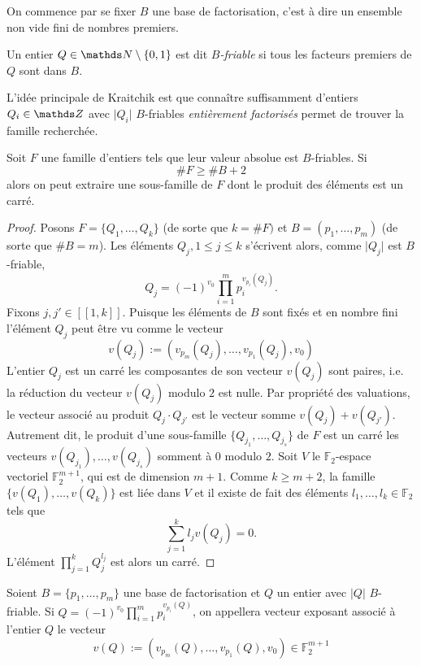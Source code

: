 On commence par se fixer $B$ une base de factorisation, c'est à dire un 
ensemble non vide fini de nombres premiers.

\begin{definition}
	Un entier $Q\in \N\setminus \{0, 1\}$ est dit \emph{$B$-friable} si tous
	les facteurs premiers de $Q$ sont dans $B$.
\end{definition}

L'idée principale de Kraitchik  est que connaître suffisamment
d'entiers $Q_i \in \Z$ avec $ \lvert Q_i \rvert$ $B$-friables 
\emph{entièrement factorisés} permet de trouver la famille recherchée.

\begin{proposition}
	Soit $F$ une famille d'entiers tels que leur valeur absolue est $B$-friables.
    Si \[\# F \geqslant \# B + 2\] alors on peut extraire une sous-famille de
    $F$ dont le produit des éléments est un carré.
\end{proposition}

\begin{proof}
	Posons $F = \{Q_1, \dots, Q_k\}$ (de sorte que $k = \# F)$ et $B = (p_1,
	\dots, p_m)$ (de sorte que $\# B = m$). Les éléments $Q_j, 1\leqslant j
    \leqslant k$ s'écrivent alors, comme $\lvert Q_j \rvert$ est $B$-friable,
    \[Q_j = (-1)^{v_0}\prod_{i=1}^m p_i^{v_{p_i}(Q_j)}.\]
	Fixons $j, j'\in [\![1, k]\!]$. Puisque les éléments de $B$ sont fixés et
	en nombre fini l'élément $Q_j$ peut être vu comme le vecteur
    \[v(Q_j) := (v_{p_m}(Q_j), \dots, v_{p_1}(Q_j), v_0 )\] L'entier $Q_j$ est
    un carré \ssi les composantes de son vecteur $v(Q_j)$ sont paires, i.e. la
	réduction du vecteur $v(Q_j)$ modulo $2$ est nulle. Par propriété des
	valuations, le vecteur associé au produit $Q_j\cdot Q_{j'}$ est le vecteur
	somme $v(Q_j) + v(Q_{j'})$. Autrement dit, le produit d'une sous-famille
	$\{Q_{j_1}, \dots, Q_{j_s}\}$ de $F$ est un carré \ssi les vecteurs
	$v(Q_{j_1}), \dots, v(Q_{j_s})$ somment à $0$ modulo $2$. Soit $V$ le
    $\mathbb{F}_2$-espace vectoriel $\mathbb{F}_2^{m+1}$, qui est de dimension
    $m+1$. Comme $k\geqslant m+2$, la famille $\{v(Q_1), \dots, v(Q_k)\}$ est 
    liée dans $V$ et il existe de fait des éléments $l_1,\dots, l_k\in 
    \mathbb{F}_2$ tels que \[\sum_{j=1}^k l_j v(Q_j) = 0.\] L'élément 
    $\prod_{j=1}^k Q_j^{l_j}$ est alors un carré.
\end{proof}

\begin{definition}
    Soient $B = \{p_1,\dots, p_m \}$ une base de factorisation et $Q$ un 
    entier avec $\lvert Q \rvert$  $B$-friable. Si $Q = (-1)^{v_0} 
    \prod_{i=1}^m p_i^{v_{p_i}(Q)}$, on appellera vecteur exposant associé
    à l'entier $Q$ le vecteur \[v(Q) := (v_{p_m}(Q), \dots, v_{p_1}(Q), v_0 )
    \in \mathbb{F}_2^{m+1} \] 
\end{definition}

